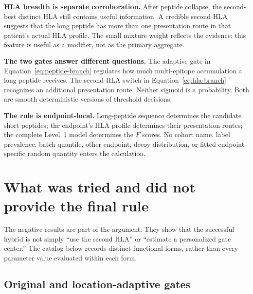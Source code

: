\documentclass[11pt]{article}
\begin{document}
\textbf{HLA breadth is separate corroboration.}
After peptide collapse, the second-best distinct HLA still contains useful
information. A credible second HLA suggests that the long peptide has more
than one presentation route in that patient's actual HLA profile. The small
mixture weight reflects the evidence: this feature is useful as a modifier,
not as the primary aggregate.

\textbf{The two gates answer different questions.}
The adaptive gate in Equation~\eqref{eq:peptide-branch} regulates how much
multi-epitope accumulation a long peptide receives. The second-HLA switch in
Equation~\eqref{eq:hla-branch} recognizes an additional presentation route.
Neither sigmoid is a probability. Both are smooth deterministic versions of
threshold decisions.

\textbf{The rule is endpoint-local.}
Long-peptide sequence determines the candidate short peptides; the endpoint's
HLA profile determines their presentation routes; the complete Level~1 model
determines the $F$ scores. No cohort name, label prevalence, batch quantile,
other endpoint, decoy distribution, or fitted endpoint-specific random
quantity enters the calculation.

\section{What was tried and did not provide the final rule}

The negative results are part of the argument. They show that the successful
hybrid is not simply ``use the second HLA'' or ``estimate a personalized gate
center.'' The catalog below records distinct functional forms, rather than
every parameter value evaluated within each form.

\subsection{Original and location-adaptive gates}
\end{document}
